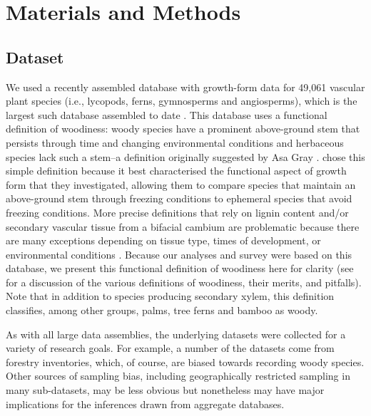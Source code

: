 \section{Materials and Methods}

\subsection{Dataset}

We used a recently assembled database with growth-form data for
49,061 vascular plant species (i.e., lycopods, ferns, gymnosperms and
angiosperms), which is the largest such database assembled to date
\citep[][available on the Dryad data repository;]{ZanneDryad,Zanne}.
%
This database uses a functional definition of woodiness: woody species
have a prominent above-ground stem that persists through time and changing
environmental conditions and herbaceous species lack such a 
stem--a definition originally suggested by Asa Gray \citeyearpar{gray1887elements}. 
\citet{Zanne}
chose this simple definition because it best characterised the functional
aspect of growth form that they investigated, allowing them to compare 
species that maintain an above-ground stem through freezing conditions to 
ephemeral species that avoid freezing conditions.  More precise definitions 
that rely on lignin content and/or secondary vascular tissue from a bifacial
cambium are problematic because there are many exceptions depending on tissue 
type, times of development, or environmental conditions 
\citep{Groover2005, Spicer2010, Rowe2012}.  
Because our analyses and survey were based on this database, 
we present this functional definition of woodiness here for clarity 
(see \citet{Zanne} for a discussion of the various definitions of woodiness, 
their merits, and pitfalls).  Note that in addition to species producing
secondary xylem, this definition
classifies, among other groups, palms, tree ferns and bamboo as
woody.

As with all large data assemblies, the underlying datasets were collected 
for a variety of research goals. For example, a number of the datasets come
from forestry inventories, which, of course, are biased towards recording
woody species. Other sources of sampling bias, including geographically restricted sampling 
in many sub-datasets, may be less obvious but
nonetheless may have major implications for the inferences drawn from 
aggregate databases.

